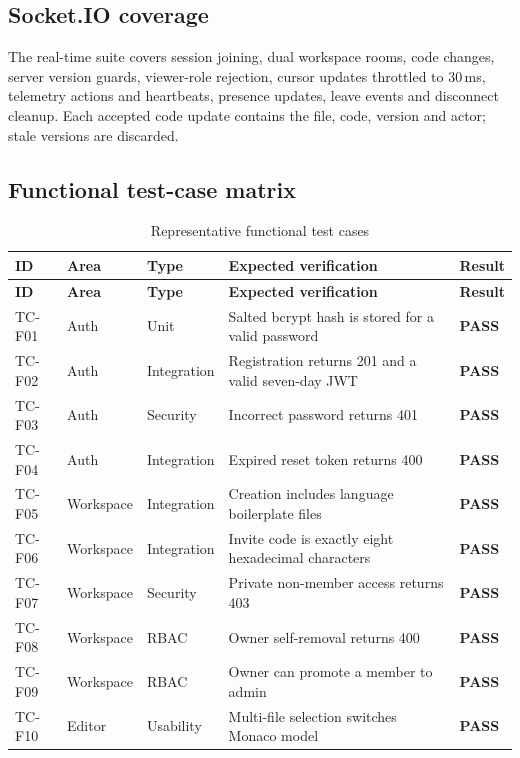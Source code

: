 \documentclass[11pt,a4paper]{article}
\newcommand{\pass}{\textcolor{passgreen}{\textbf{PASS}}}
\newcommand{\tableheader}[1]{\textbf{#1}}
\begin{document}
\subsection{Socket.IO coverage}
The real-time suite covers session joining, dual workspace rooms, code changes,
server version guards, viewer-role rejection, cursor updates throttled to 30\,ms,
telemetry actions and heartbeats, presence updates, leave events and disconnect
cleanup. Each accepted code update contains the file, code, version and actor;
stale versions are discarded.

\subsection{Functional test-case matrix}
\scriptsize
\begin{xltabular}{\textwidth}{L{1.3cm} L{1.8cm} L{2.0cm} Y C{1.0cm}}
\caption{Representative functional test cases}\label{tab:functional}\\
\toprule
{}
\tableheader{ID} & \tableheader{Area} & \tableheader{Type} & \tableheader{Expected verification} & \tableheader{Result}\\
\midrule
\endfirsthead
\toprule
{}
\tableheader{ID} & \tableheader{Area} & \tableheader{Type} & \tableheader{Expected verification} & \tableheader{Result}\\
\midrule
\endhead
TC-F01 & Auth & Unit & Salted bcrypt hash is stored for a valid password & \pass\\
TC-F02 & Auth & Integration & Registration returns 201 and a valid seven-day JWT & \pass\\
TC-F03 & Auth & Security & Incorrect password returns 401 & \pass\\
TC-F04 & Auth & Integration & Expired reset token returns 400 & \pass\\
TC-F05 & Workspace & Integration & Creation includes language boilerplate files & \pass\\
TC-F06 & Workspace & Integration & Invite code is exactly eight hexadecimal characters & \pass\\
TC-F07 & Workspace & Security & Private non-member access returns 403 & \pass\\
TC-F08 & Workspace & RBAC & Owner self-removal returns 400 & \pass\\
TC-F09 & Workspace & RBAC & Owner can promote a member to admin & \pass\\
TC-F10 & Editor & Usability & Multi-file selection switches Monaco model & \pass\\

\end{xltabular}
\end{document}

